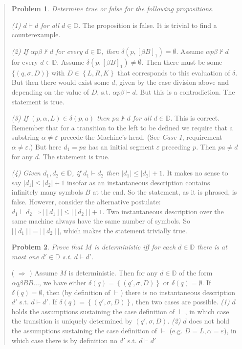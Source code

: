 \documentclass[a4paper, 12pt]{article}
\newtheorem{problem}{Problem}
\newtheorem{problem}{Problem}
\begin{document}
\small
\begin{quote}

\begin{problem}
    Determine true or false for the following propositions.
\end{problem}

\textit{(1) $d \vdash d$ for all $d \in \mathbb{D}$}. The proposition is false.
It is trivial to find a counterexample.

\textit{(2) If $\alpha p \beta  \not\vdash  d$ for every $d \in \mathbb{D}$,
then $\delta(p, [\beta B]_1) = \emptyset$}. Assume $\alpha p \beta \not\vdash d$
for every $d \in \mathbb{D}$. Assume $\delta(p, [\beta B]_1) \neq \emptyset$.
Then there must be some $\{(q, \sigma, D)\}$ with $D \in \left\{ L, R, K
\right\} $ that corresponds to this evaluation of $\delta$. But then there would
exist some $d$, given by the case division above and depending on the value of
$D$, s.t. $\alpha p \beta \vdash d$. But this is a contradiction. The statement
is true.

\textit{(3) If $(p, \alpha, L) \in \delta(p, a)$ then $pa \not\vdash d$ for all
$d \in \mathbb{D}$}. This is correct. Remember that for a transition to the left
to be defined we require that a substring $\alpha \neq \varepsilon$ precede the
Machine's head. (See \textit{Case 1}, requirement $\alpha \neq \varepsilon$.) But
here $d_1 = pa$ has an initial segment $\varepsilon$ preceding $p$. Then $pa \neq
d$ for any $d$. The statement is true.

\textit{(4)} \textit{  Given $d_1, d_2 \in \mathbb{D}$, if $d_1 \vdash d_2$ then
$|d_1| \leq |d_2| + 1$. } It makes no sense to say $|d_1| \leq |d_2| + 1$
insofar as an instantaneous description contains infinitely many symbols $B$ at
the end. So the statement, as it is phrased, is false. However, consider the
alternative postulate: $d_1 \vdash d_2 \Rightarrow |\left\lfloor d_1
\right\rfloor| \leq | \left\lfloor d_2 \right\rfloor | + 1$. Two instantaneous
description over the same machine always have the same number of symbols. So $ |
\left\lfloor d_1 \right\rfloor| = | \left\lfloor d_2 \right\rfloor | $, which
makes the statement trivially true.

\begin{problem}
    Prove that $M$ is deterministic iff for each $d \in \mathbb{D}$ there is
    \textit{at most} one $d' \in \mathbb{D}$ s.t. $d \vdash d'$.
\end{problem}

( $\Rightarrow$ ) Assume $M$ is deterministic. Then for any $d \in \mathbb{D}$
of the form $\alpha q \beta B B \ldots$, we have either $\delta(q) = \left\{
(q', \sigma, D) \right\} $ or $\delta(q) = \emptyset$. If $\delta(q) =
\emptyset$, then (by definition of $\vdash$) there is no instantaneous description $d'$ s.t. $d \vdash d'$.
If $\delta(q) = \left\{ (q', \sigma, D) \right\} $, then two cases are possible.
\textit{(1)} $d$ holds the assumptions sustaining the case definition of
$\vdash$, in which case the transition is uniquely determined by $(q',
\sigma, D)$. \textit{(2)} $d$ does not hold the assumptions sustaining the
case definition of $\vdash$ (e.g. $D = L, \alpha = \varepsilon$), in which case
there is by definition no $d'$ s.t. $d \vdash d'$


\end{quote}
\end{document}
